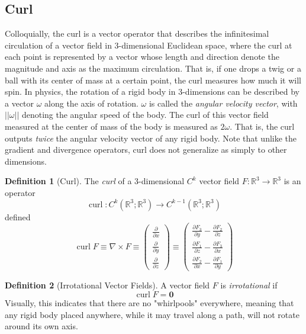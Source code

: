 \documentclass{article}
\DeclareMathOperator{\curl}{curl}
\theoremstyle{remark}
\theoremstyle{definition}
\newtheorem{definition}{Definition}[section]
\begin{document}
\subsection{Curl}
Colloquially, the curl is a vector operator that describes the infinitesimal circulation of a vector field in $3$-dimensional Euclidean space, where the curl at each point is represented by a vector whose length and direction denote the magnitude and axis as the maximum circulation. That is, if one drops a twig or a ball with its center of mass at a certain point, the curl measures how much it will spin. In physics, the rotation of a rigid body in 3-dimensions can be described by a vector $\omega$ along the axis of rotation. $\omega$ is called the \textit{angular velocity vector}, with $||\omega||$ denoting the angular speed of the body. The curl of this vector field measured at the center of mass of the body is measured as $2 \omega$. That is, the curl outputs \textit{twice} the angular velocity vector of any rigid body. Note that unlike the gradient and divergence operators, curl does not generalize as simply to other dimensions. 

\begin{definition}[Curl]
The \textit{curl} of a 3-dimensional $C^k$ vector field $F: \mathbb{R}^3 \longrightarrow \mathbb{R}^3$ is an operator
\[\curl: C^k (\mathbb{R}^3; \mathbb{R}^3) \longrightarrow C^{k-1} (\mathbb{R}^3; \mathbb{R}^3)\]
defined
\[\curl{F} \equiv \nabla \times F \equiv \begin{pmatrix}
\frac{\partial}{\partial x} \\ \frac{\partial}{\partial y}\\ \frac{\partial}{\partial z} \end{pmatrix} \equiv \begin{pmatrix}
\frac{\partial F_3}{\partial y} - \frac{\partial F_2}{\partial z} \\
\frac{\partial F_1}{\partial z} - \frac{\partial F_3}{\partial x} \\
\frac{\partial F_2}{\partial x} - \frac{\partial F_1}{\partial y}
\end{pmatrix}\]
\end{definition}

\begin{definition}[Irrotational Vector Fields]
A vector field $F$ is \textit{irrotational} if 
\[\curl{F} = \mathbf{0}\]
Visually, this indicates that there are no "whirlpools" everywhere, meaning that any rigid body placed anywhere, while it may travel along a path, will not rotate around its own axis. 
\end{definition}
\end{document}
